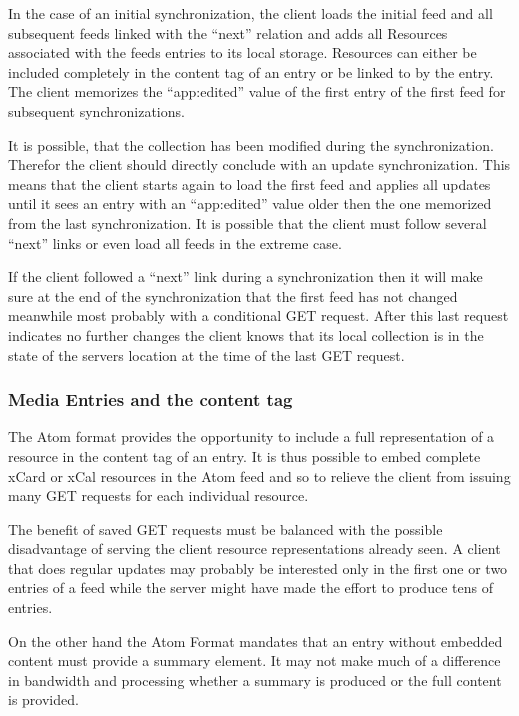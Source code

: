 \documentclass[12pt,a4paper]{scrartcl}		%
\begin{document}
In the case of an initial synchronization, the client loads the initial feed and
all subsequent feeds linked with the ``next'' relation and adds all Resources
associated with the feeds entries to its local storage. Resources can either be
included completely in the content tag of an entry or be linked to by the
entry. The client memorizes the ``app:edited'' value of the first entry of the
first feed for subsequent synchronizations.

It is possible, that the collection has been modified during the
synchronization. Therefor the client should directly conclude with an update
synchronization. This means that the client starts again to load the first feed
and applies all updates until it sees an entry with an ``app:edited'' value
older then the one memorized from the last synchronization. It is possible that
the client must follow several ``next'' links or even load all feeds in the
extreme case.

If the client followed a ``next'' link during a synchronization then it will
make sure at the end of the synchronization that the first feed has not changed
meanwhile most probably with a conditional GET request. After this last request
indicates no further changes the client knows that its local collection is in
the state of the servers location at the time of the last GET request.

\subsubsection{Media Entries and the content tag}
\label{sec:inline-feeds-or}

The Atom format provides the opportunity to include a full representation of a
resource in the content tag of an entry.\cite[sec. 4.1.3]{RFC4287} It is thus
possible to embed complete xCard or xCal resources in the Atom feed
and so to relieve the client from issuing many GET requests for each individual
resource.

The benefit of saved GET requests must be balanced with the possible
disadvantage of serving the client resource representations already seen. A
client that does regular updates may probably be interested only in the first
one or two entries of a feed while the server might have made the effort to
produce tens of entries.

On the other hand the Atom Format mandates that an entry without embedded
content must provide a summary element. It may not make much of a difference in
bandwidth and processing whether a summary is produced or the full content is
provided.
\end{document}
